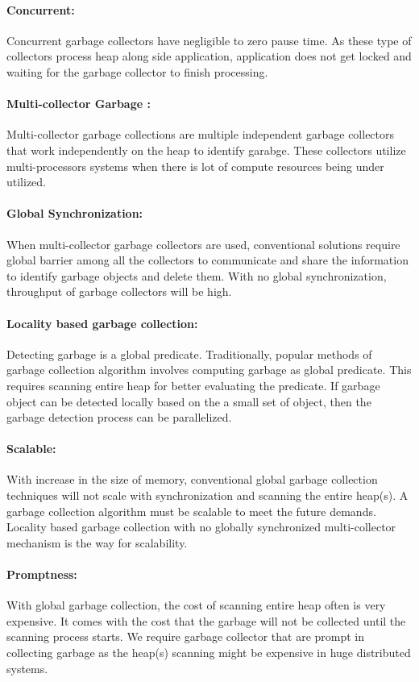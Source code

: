 \paragraph{Concurrent:}
	Concurrent garbage collectors have negligible to zero pause time. As these type of collectors process heap along side application, application does not get locked and waiting for the garbage collector to finish processing.
\paragraph{Multi-collector Garbage :}
	Multi-collector garbage collections are multiple independent garbage collectors that work independently on the heap to identify garabge. These collectors utilize multi-processors systems when there is lot of compute resources being under utilized.
\paragraph{Global Synchronization:}
	When multi-collector garbage collectors are used, conventional solutions require global barrier among all the collectors to communicate and share the information to identify garbage objects and delete them. With no global synchronization, throughput of garbage collectors will be high.
\paragraph{Locality based garbage collection:}
	Detecting garbage is a global predicate. Traditionally, popular methods of garbage collection algorithm involves computing garbage as global predicate. This requires scanning entire heap for better evaluating the predicate. If garbage object can be detected locally based on the a small set of object, then the garbage detection process can be parallelized.
\paragraph{Scalable:}
	With increase in the size of memory, conventional global garbage collection techniques will not scale with synchronization and scanning the entire heap(s). A garbage collection algorithm must be scalable to meet the future demands. Locality based garbage collection with no globally synchronized multi-collector mechanism is the way for scalability.
\paragraph{Promptness:}
	With global garbage collection, the cost of scanning entire heap often is very expensive. It comes with the cost that the garbage will not be collected until the scanning process starts. We require garbage collector that are prompt in collecting garbage as the heap(s) scanning might be expensive in huge distributed systems.
